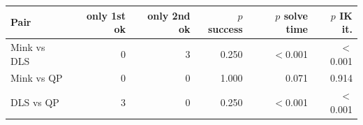 \begin{tabular}{lrrrrr}
\toprule
Pair & only 1st ok & only 2nd ok & $p$ success & $p$ solve time & $p$ IK it.\\
\midrule
Mink vs DLS & 0 & 3 & 0.250 & $<$0.001 & $<$0.001\\
Mink vs QP & 0 & 0 & 1.000 & 0.071 & 0.914\\
DLS vs QP & 3 & 0 & 0.250 & $<$0.001 & $<$0.001\\
\bottomrule
\end{tabular}
